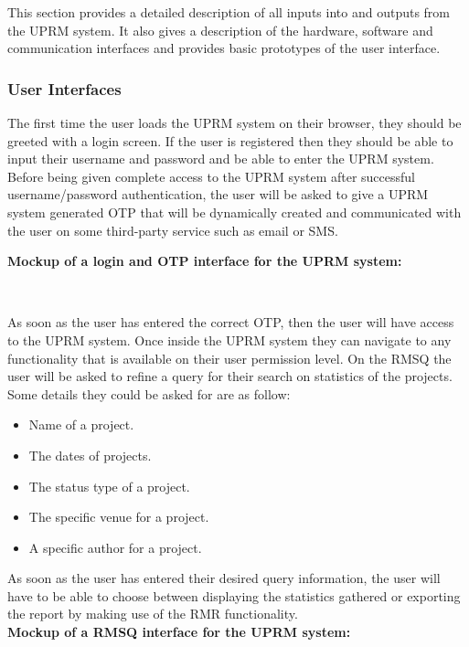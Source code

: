 This section provides a detailed description of all inputs into and outputs from the UPRM system. It also gives a description of the hardware, software and communication interfaces and provides basic prototypes of the user interface.

\subsubsection{User Interfaces}
	The first time the user loads the UPRM system on their browser, they should be greeted with a login screen. If the user is registered then they should be able to input their username and password and be able to enter the UPRM system. Before being given complete access to the UPRM system after successful username/password authentication, the user will be asked to give a UPRM system generated OTP that will be dynamically created and communicated with the user on some third-party service such as email or SMS.
	
	\textbf{Mockup of a login and OTP interface for the UPRM system: }\\
	\centerline{}\\
	\centerline{}
	
	As soon as the user has entered the correct OTP, then the user will have access to the UPRM system. Once inside the UPRM system they can navigate to any functionality that is available on their user permission level. On the RMSQ the user will be asked to refine a query for their search on statistics of the projects. Some details they could be asked for are as follow:
	\begin{itemize}
		\item Name of a project.
		\item The dates of projects.
		\item The status type of a project.
		\item The specific venue for a project.
		\item A specific author for a project.
	\end{itemize}
	As soon as the user has entered their desired query information, the user will have to be able to choose between displaying the statistics gathered or exporting the report by making use of the RMR functionality.\\
	\textbf{Mockup of a RMSQ interface for the UPRM system: }\\
	\centerline{}\\
	

